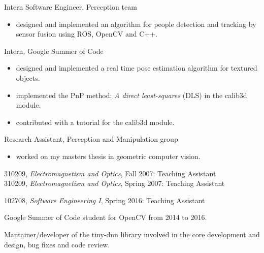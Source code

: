 \documentclass{article}
\begin{document}
\begin{llist}
Intern Software Engineer, Perception team
\vspace{-0.33cm}
\begin{itemize}
 \item designed and implemented an algorithm for people detection and tracking by sensor fusion using ROS, OpenCV and C++.
\end{itemize}

Intern, Google Summer of Code
\vspace{-0.33cm}
\begin{itemize}
 \item designed and implemented a real time pose estimation algorithm for textured objects.
 \item implemented the PnP method: \textit{A direct least-squares} (DLS) in the calib3d module.
 \item contributed with a tutorial for the calib3d module.
\end{itemize}

Research Assistant, Perception and Manipulation group
\vspace{-0.33cm}
\begin{itemize}
 \item worked on my masters thesis in geometric computer vision.
\end{itemize}


\label{Teaching Experience}

310209, {\em Electromagnetism and Optics}, Fall 2007: Teaching Assistant\\
310209, {\em Electromagnetism and Optics}, Spring 2007: Teaching Assistant

102708, {\em Software Engineering I}, Spring 2016: Teaching Assistant\\

\vspace{-0.4cm}

Google Summer of Code student for OpenCV from 2014 to 2016.

Mantainer/developer of the tiny-dnn library involved in the core development and design, bug fixes and code review.


\end{llist}
\end{document}
